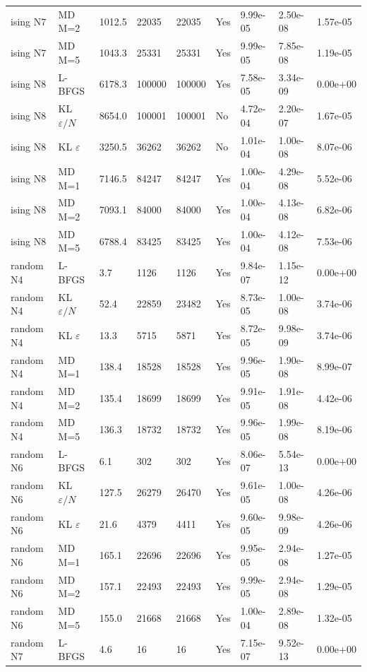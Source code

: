 \begin{table}
\begin{tabular}{lllllllll}
ising N7 & MD M=2 & 1012.5 & 22035 & 22035 & Yes & 9.99e-05 & 2.50e-08 & 1.57e-05 \\
ising N7 & MD M=5 & 1043.3 & 25331 & 25331 & Yes & 9.99e-05 & 7.85e-08 & 1.19e-05 \\
ising N8 & L-BFGS & 6178.3 & 100000 & 100000 & Yes & 7.58e-05 & 3.34e-09 & 0.00e+00 \\
ising N8 & KL $\varepsilon/N$ & 8654.0 & 100001 & 100001 & No & 4.72e-04 & 2.20e-07 & 1.67e-05 \\
ising N8 & KL $\varepsilon$ & 3250.5 & 36262 & 36262 & No & 1.01e-04 & 1.00e-08 & 8.07e-06 \\
ising N8 & MD M=1 & 7146.5 & 84247 & 84247 & Yes & 1.00e-04 & 4.29e-08 & 5.52e-06 \\
ising N8 & MD M=2 & 7093.1 & 84000 & 84000 & Yes & 1.00e-04 & 4.13e-08 & 6.82e-06 \\
ising N8 & MD M=5 & 6788.4 & 83425 & 83425 & Yes & 1.00e-04 & 4.12e-08 & 7.53e-06 \\
random N4 & L-BFGS & 3.7 & 1126 & 1126 & Yes & 9.84e-07 & 1.15e-12 & 0.00e+00 \\
random N4 & KL $\varepsilon/N$ & 52.4 & 22859 & 23482 & Yes & 8.73e-05 & 1.00e-08 & 3.74e-06 \\
random N4 & KL $\varepsilon$ & 13.3 & 5715 & 5871 & Yes & 8.72e-05 & 9.98e-09 & 3.74e-06 \\
random N4 & MD M=1 & 138.4 & 18528 & 18528 & Yes & 9.96e-05 & 1.90e-08 & 8.99e-07 \\
random N4 & MD M=2 & 135.4 & 18699 & 18699 & Yes & 9.91e-05 & 1.91e-08 & 4.42e-06 \\
random N4 & MD M=5 & 136.3 & 18732 & 18732 & Yes & 9.96e-05 & 1.99e-08 & 8.19e-06 \\
random N6 & L-BFGS & 6.1 & 302 & 302 & Yes & 8.06e-07 & 5.54e-13 & 0.00e+00 \\
random N6 & KL $\varepsilon/N$ & 127.5 & 26279 & 26470 & Yes & 9.61e-05 & 1.00e-08 & 4.26e-06 \\
random N6 & KL $\varepsilon$ & 21.6 & 4379 & 4411 & Yes & 9.60e-05 & 9.98e-09 & 4.26e-06 \\
random N6 & MD M=1 & 165.1 & 22696 & 22696 & Yes & 9.95e-05 & 2.94e-08 & 1.27e-05 \\
random N6 & MD M=2 & 157.1 & 22493 & 22493 & Yes & 9.99e-05 & 2.94e-08 & 1.29e-05 \\
random N6 & MD M=5 & 155.0 & 21668 & 21668 & Yes & 1.00e-04 & 2.89e-08 & 1.32e-05 \\
random N7 & L-BFGS & 4.6 & 16 & 16 & Yes & 7.15e-07 & 9.52e-13 & 0.00e+00 \\

\end{tabular}
\end{table}
